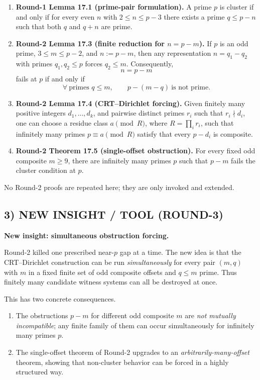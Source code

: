 \begin{enumerate}
\item \textbf{Round-1 Lemma 17.1 (prime-pair formulation).} A prime $p$ is cluster if and only if for every even $n$ with $2\le n\le p-3$ there exists a prime $q\le p-n$ such that both $q$ and $q+n$ are prime.

\item \textbf{Round-2 Lemma 17.3 (finite reduction for $n=p-m$).} If $p$ is an odd prime, $3\le m\le p-2$, and $n:=p-m$, then any representation $n=q_1-q_2$ with primes $q_1,q_2\le p$ forces $q_2\le m$. Consequently,
\[
n=p-m
\]
fails at $p$ if and only if
\[
\forall\ \text{primes }q\le m,\qquad p-(m-q)\ \text{is not prime}.
\]

\item \textbf{Round-2 Lemma 17.4 (CRT--Dirichlet forcing).} Given finitely many positive integers $d_1,\dots,d_k$, and pairwise distinct primes $r_i$ such that $r_i\nmid d_i$, one can choose a residue class $a\pmod{R}$, where $R=\prod_i r_i$, such that infinitely many primes $p\equiv a\pmod R$ satisfy that every $p-d_i$ is composite.

\item \textbf{Round-2 Theorem 17.5 (single-offset obstruction).} For every fixed odd composite $m\ge 9$, there are infinitely many primes $p$ such that $p-m$ fails the cluster condition at $p$.
\end{enumerate}

No Round-2 proofs are repeated here; they are only invoked and extended.

\subsection*{3) NEW INSIGHT / TOOL (ROUND-3)}

\textbf{New insight: simultaneous obstruction forcing.}

Round-2 killed one prescribed near-$p$ gap at a time. The new idea is that the CRT--Dirichlet construction can be run \emph{simultaneously} for every pair $(m,q)$ with $m$ in a fixed finite set of odd composite offsets and $q\le m$ prime. Thus finitely many candidate witness systems can all be destroyed at once.

This has two concrete consequences.

\begin{enumerate}
\item The obstructions $p-m$ for different odd composite $m$ are \emph{not mutually incompatible}; any finite family of them can occur simultaneously for infinitely many primes $p$.
\item The single-offset theorem of Round-2 upgrades to an \emph{arbitrarily-many-offset} theorem, showing that non-cluster behavior can be forced in a highly structured way.
\end{enumerate}

